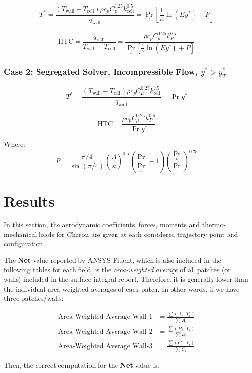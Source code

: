 \documentclass[12pt]{article}
\begin{document}
$$
T^* = \frac{(T_{\text{wall}} - T_{\text{cell}})\rho c_p C_\mu^{0.25} k_{\text{cell}}^{0.5}}{q_{\text{wall}}} = \Pr_t \left[ \frac{1}{\kappa} \ln(E y^*) + P \right]
$$

$$
\text{HTC} = \frac{q_{\text{wall}}}{T_{\text{wall}} - T_{\text{cell}}} = \frac{\rho c_p C_\mu^{0.25} k_P^{0.5}}{\Pr_t \left[ \frac{1}{\kappa} \ln(E y^*) + P \right]}
$$

\subsubsection*{Case 2: Segregated Solver, Incompressible Flow, $ y^* > y^*_T $}

$$
T^* = \frac{(T_{\text{wall}} - T_{\text{cell}})\rho c_p C_\mu^{0.25} k_{\text{cell}}^{0.5}}{q_{\text{wall}}} = \Pr y^*
$$

$$
\text{HTC} = \frac{\rho c_p C_\mu^{0.25} k_P^{0.5}}{\Pr y^*}
$$

Where:
$$
P = \frac{\pi/4}{\sin(\pi/4)} \left( \frac{A}{\kappa} \right)^{0.5} \left( \frac{\Pr}{\Pr_t} - 1 \right) \left( \frac{\Pr_t}{\Pr} \right)^{0.25}
$$

\section{Results}\label{sec:results}
In this section, the aerodynamic coefficients, forces, moments and thermo-mechanical loads for Charon are given at each considered trajectory point and configuration.

The \textbf{Net} value reported by ANSYS Fluent, which is also included in the following tables for each field, is the \textit{area-weighted average} of all patches (or walls) included in the surface integral report. Therefore, it is generally lower than the individual area-weighted averages of each patch. In other words, if we have three patches/walls:

\begin{align*}
\text{Area-Weighted Average Wall-1} &= \frac{\sum (A_i \cdot Y_i)}{\sum A_i} \\
\text{Area-Weighted Average Wall-2} &= \frac{\sum (B_i \cdot Y_i)}{\sum B_i} \\
\text{Area-Weighted Average Wall-3} &= \frac{\sum (C_i \cdot Y_i)}{\sum C_i}
\end{align*}

Then, the correct computation for the \textbf{Net} value is:
\end{document}

